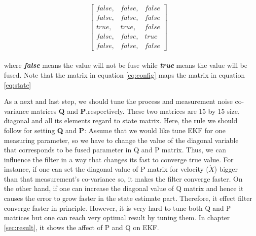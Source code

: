 \\
\begin{equation}\label{eq:config}
    \begin{bmatrix}
    false,&false,&false\\
    false,&false,&false\\
    true,&true,&false\\
    false,&false,&true\\
    false,&false,&false
    \end{bmatrix}
\end{equation}\\

\noindent where \textbf{\textit{false}} means the value will not be fuse while \textbf{\textit{true}} means the value will be fused. Note that the matrix in equation \eqref{eq:config} maps the matrix in equation \eqref{eq:state}

\par As a next and last step, we should tune the process and measurement noise co-variance matrices \textbf {Q} and \textbf{P},respectively. These two matrices are 15 by 15 size, diagonal and all its elements regard to state matrix. Here, the rule we should follow for setting \textbf {Q} and \textbf{P}: Assume that we would like tune EKF for one measuring parameter, so we have to change the value of the diagonal variable that corresponds to be fused parameter in Q and P matrix. Thus, we can influence the filter in a way that changes its fast to converge true value. For instance, if one can set the diagonal value of P matrix for velocity ($\dot X$) bigger than that measurement’s co-variance so, it makes the filter converge faster. On the other hand, if one can increase the diagonal value of Q matrix and hence it causes the error to grow faster in the state estimate part. Therefore, it effect filter converge faster in principle. However, it is very hard to tune both Q and P matrices but one can reach very optimal result by tuning them. In chapter \ref{sec:result}, it shows the affect of P and Q on EKF.

